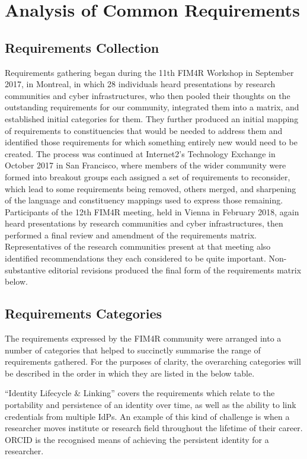 \documentclass[fleqn,11pt]{wlscirep}
\begin{document}
{\section{Analysis of Common Requirements}

\subsection{Requirements Collection}
Requirements gathering began during the 11th FIM4R Workshop in September 2017, in Montreal, in which 28 individuals heard presentations by research communities and cyber infrastructures, who then pooled their thoughts on the outstanding requirements for our community, integrated them into a matrix, and established initial categories for them. They further produced an initial mapping of requirements to constituencies that would be needed to address them and identified those requirements for which something entirely new would need to be created. The process was continued at Internet2’s Technology Exchange in October 2017 in San Francisco, where members of the wider community were formed into breakout groups each assigned a set of requirements to reconsider, which lead to some requirements being removed, others merged, and sharpening of the language and constituency mappings used to express those remaining. Participants of the 12th FIM4R meeting, held in Vienna in February 2018, again heard presentations by research communities and cyber infrastructures, then performed a final review and amendment of the requirements matrix. Representatives of the research communities present at that meeting also identified recommendations they each considered to be quite important. Non-substantive editorial revisions produced the final form of the requirements matrix below.

\subsection{Requirements Categories}
The requirements expressed by the FIM4R community were arranged into a number of categories that helped to succinctly summarise the range of requirements gathered.  For the purposes of clarity, the overarching categories will be described in the order in which they are listed in the below table.

“Identity Lifecycle \& Linking” covers the requirements which relate to the portability and persistence of an identity over time, as well as the ability to link credentials from multiple IdPs.  An example of this kind of challenge is when a researcher moves institute or research field throughout the lifetime of their career.  ORCID is the recognised means of achieving the persistent identity for a researcher.

}
\end{document}
